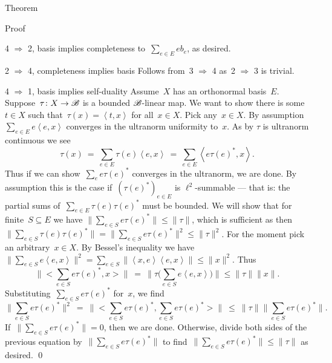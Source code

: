 \documentclass[b]{subfiles}
\begin{document}
\begin{parsec}
\begin{point}{Theorem}
\begin{point}{Proof}
\begin{point}{4 $\Rightarrow$ 2, basis implies completeness}
to~$\sum_{e \in E} e b_e$, as desired.
\end{point}
\begin{point}{2 $\Rightarrow$ 4, completeness implies basis}%
    Follows from~3 $\Rightarrow$ 4
        as~2 $\Rightarrow$ 3 is trivial.
\end{point}
\begin{point}{4 $\Rightarrow$ 1, basis implies self-duality}%
    Assume~$X$ has an orthonormal basis~$E$.
    Suppose~$\tau\colon X \to \mathscr{B}$ is a bounded $\mathscr{B}$-linear map.
    We want to show there is some~$t \in X$
    such that~$\tau(x) = \left<t,x\right>$ for all~$x \in X$.
    Pick any~$x \in X$.
    By assumption~$\sum_{e \in E} e  \left<e,x\right>$
        converges in the ultranorm uniformity to~$x$.
As by  $\tau$ is ultranorm continuous
        we see
        \begin{equation*}
            \tau(x) \ =\  \sum_{e \in E} \tau(e) \left<e,x\right>
                \ =\  \sum_{e \in E} \left<e \tau(e)^*,x\right>.
        \end{equation*}
    Thus if we can show~$\sum_e e \tau(e)^*$ converges in the ultranorm,
        we are done. By assumption this is
            the case if~$(\tau(e)^*)_{e \in E} $ is $\ell^2$-summable
            --- that is: the partial sums of~$\sum_{e \in E} \tau(e)\tau(e)^*$
                must be bounded.
        We will show
        that for finite~$S \subseteq E$
        we have
        $\|\sum_{e \in S} e \tau(e)^* \|\leq \|\tau\|$,
        which is sufficient as then~$ \| \sum_{e \in S}  \tau(e)\tau(e)^* \|
        =\|\sum_{e \in S} e \tau(e)^* \|^2  \leq \|\tau\|^2$.
For the moment pick an arbitrary~$x \in X$.
By Bessel's inequality
we have~$
\| \sum_{e\in S} e \left<e,x\right>\|^2
    = \sum_{e\in S} \|\left<x,e\right>\left<e,x\right>\|
    \leq \|x\|^2$.
Thus
    \begin{equation*}
        \bigl\|\bigl< \sum_{e \in S} e \tau(e)^*,x\bigr>\bigr\|
        \ =\  \bigl\| \tau \bigl(\sum_{e \in S} e\left<e,x\right>\bigr) \bigr\|
        \leq \|\tau\| \|x\|.
    \end{equation*}
Substituting~$\sum_{e \in S} e \tau(e)^*$ for~$x$, we find
\begin{equation*}
    \| \sum_{e\in S}e \tau(e)^*\|^2 \ =\ 
    \bigl\|\bigl< \sum_{e \in S} e \tau(e)^*,\sum_{e \in S} e\tau(e)^*\bigr>\bigr\|
    \ \leq \ \|\tau\| \bigl\| \sum_{e\in S}e \tau(e)^*\bigr\|.
\end{equation*}
If~$ \| \sum_{e\in S}e \tau(e)^*\| = 0$,
then we are done.
Otherwise, divide both sides of the previous equation
by~$ \| \sum_{e\in S}e \tau(e)^*\|$
to find~$ \| \sum_{e\in S}e \tau(e)^*\| \leq \|\tau\|$ as desired. \qed
\end{point}
\end{point}
\end{point}
\end{parsec}
\end{document}
